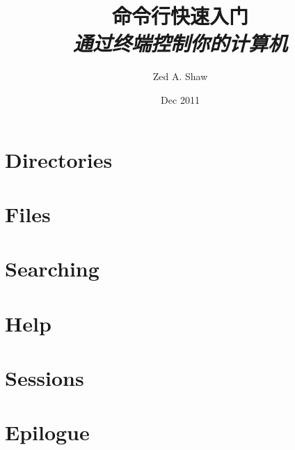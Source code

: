 


\title{
    命令行快速入门\\
    \textit{通过终端控制你的计算机}
}
\author{Zed A. Shaw}
\date{Dec 2011}



\frontmatter

\maketitle

\tableofcontents



\mainmatter







\part{Directories}







\part{Files}










\part{Searching}




\part{Help}




\part{Sessions}





\part{Epilogue}



\appendix


